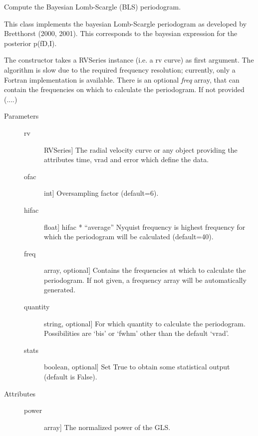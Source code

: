 \documentclass[letterpaper,10pt,english]{sphinxmanual}
\begin{document}
\begin{fulllineitems}
\label{api:OPEN.periodograms.bls}
Compute the Bayesian Lomb-Scargle (BLS) periodogram.

This class implements the bayesian Lomb-Scargle periodogram as
developed by Bretthorst (2000, 2001). This corresponds to the 
bayesian expression for the posterior p(f\textbar{}D,I).

The constructor takes a RVSeries instance (i.e. a rv curve) as 
first argument. The algorithm is slow due to the required frequency
resolution; currently, only a Fortran implementation is available.
There is an optional \emph{freq} array, that can contain the 
frequencies on which to calculate the periodogram. If not provided
(....)
\begin{description}
\item[{Parameters}] \leavevmode\begin{description}
\item[{rv}] \leavevmode{[}RVSeries{]}
The radial velocity curve or any object providing the attributes
time, vrad and error which define the data.

\item[{ofac}] \leavevmode{[}int{]}
Oversampling factor (default=6).

\item[{hifac}] \leavevmode{[}float{]}
hifac * ``average'' Nyquist frequency is highest frequency for 
which the periodogram will be calculated (default=40).

\item[{freq}] \leavevmode{[}array, optional{]}
Contains the frequencies at which to calculate the periodogram.
If not given, a frequency array will be automatically generated.

\item[{quantity}] \leavevmode{[}string, optional{]}
For which quantity to calculate the periodogram. Possibilities are
`bis' or `fwhm' other than the default `vrad'.

\item[{stats}] \leavevmode{[}boolean, optional{]}
Set True to obtain some statistical output (default is False).

\end{description}

\item[{Attributes}] \leavevmode\begin{description}
\item[{power}] \leavevmode{[}array{]}
The normalized power of the GLS.


\end{description}
\end{description}
\end{fulllineitems}
\end{document}
